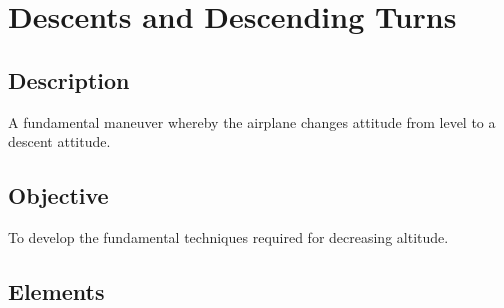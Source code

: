 \section{Descents and Descending Turns}

\subsection{Description}

A fundamental maneuver whereby the airplane changes attitude from level to a
descent attitude.

\subsection{Objective}

To develop the fundamental techniques required for decreasing altitude.

\subsection{Elements}

